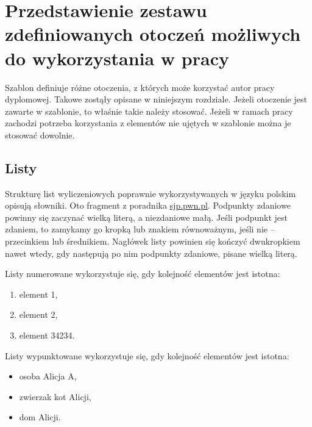 %



\chapter{Przedstawienie zestawu zdefiniowanych otoczeń możliwych do wykorzystania w pracy}

Szablon definiuje różne otoczenia, z których może korzystać autor pracy dyplomowej. Takowe zostąły opisane w niniejszym rozdziale. Jeżeli otoczenie jest zawarte w szablonie, to właśnie takie należy stosować. Jeżeli w ramach pracy zachodzi potrzeba korzystania z elementów nie ujętych w szablonie można je stosować dowolnie.

\section{Listy}

Strukturę list wyliczeniowych poprawnie wykorzystywanych w języku polskim opisują słowniki. Oto fragment z poradnika \url{sjp.pwn.pl}. Podpunkty zdaniowe powinny się zaczynać wielką literą, a niezdaniowe małą. Jeśli podpunkt jest zdaniem, to zamykamy go kropką lub znakiem równoważnym, jeśli nie – przecinkiem lub średnikiem.  Nagłówek listy powinien się kończyć dwukropkiem nawet wtedy, gdy następują po nim podpunkty zdaniowe, pisane wielką literą. 

\noindent Listy numerowane wykorzystuje się, gdy kolejność elementów jest istotna:
\begin{enumerate}
\item element 1,
\item element 2,
\item element 34234.
\end{enumerate}

\noindent Listy wypunktowane wykorzystuje się, gdy kolejność elementów jest istotna:
\begin{itemize}
\item osoba Alicja A, 
\item zwierzak kot Alicji,
\item dom Alicji.
\end{itemize}

